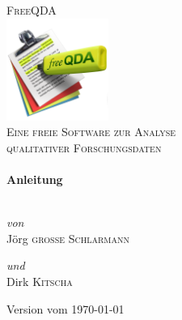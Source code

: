 \documentclass[a4paper,%
			12pt, 		%
			DIV=calc, 	%
			oneside, 	%
			headsepline, 	%
			ngerman, 	%
			smallheadings, 	%
			openany, 	%
			liststotoc, 	%
			bibtotoc]	%
			{scrbook} 	%
\begin{document}

%

	
\begin{titlepage}

\begin{center}


\textsc{\LARGE FreeQDA}\\[1.5cm]
\includegraphics[width=0.25\textwidth]{img/freeQDA_FINAL_1024}\\[1cm]    



\textsc{\Large Eine freie Software zur Analyse \\qualitativer Forschungsdaten}\\[0.5cm]


\HRule \\[0.4cm]
{ \huge \bfseries Anleitung}\\[0.4cm]

\HRule \\[1.9cm]

\begin{minipage}{0.4\textwidth}
\begin{flushleft} \large
\emph{von}\\
Jörg \textsc{große Schlarmann}
\end{flushleft}
\end{minipage}
\begin{minipage}{0.4\textwidth}
\begin{flushright} \large
\emph{und} \\
Dirk \textsc{Kitscha}
\end{flushright}
\end{minipage}

\vfill

{\large Version vom \today}

\end{center}

\end{titlepage}
\end{document}
